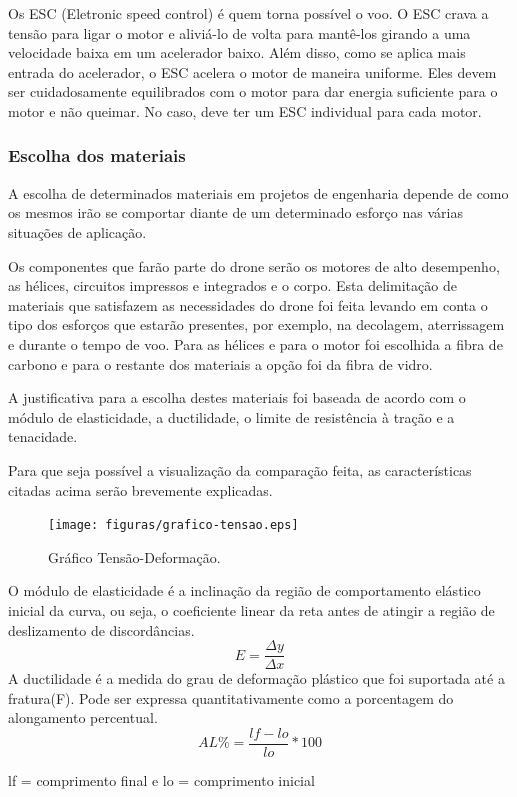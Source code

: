 Os ESC (Eletronic speed control) é quem torna possível o voo. O ESC crava a tensão para ligar o motor e aliviá-lo de volta para mantê-los girando a uma velocidade baixa em um acelerador baixo. Além disso, como se aplica mais entrada do acelerador, o ESC acelera o motor de maneira uniforme.  Eles devem ser cuidadosamente equilibrados com o motor para dar energia suficiente para o motor e não queimar. No caso, deve ter um ESC individual para cada motor. 

\subsubsection{Escolha dos materiais}

A escolha de determinados materiais em projetos de engenharia depende de como os mesmos irão se comportar diante de um determinado esforço nas várias situações de aplicação.

Os componentes que farão parte do drone serão os motores de alto desempenho, as hélices, circuitos impressos e integrados e o corpo.
Esta delimitação de materiais que satisfazem as necessidades do drone foi feita levando em conta o tipo dos esforços que estarão presentes, por exemplo, na decolagem, aterrissagem e durante o tempo de voo. Para as hélices e para o motor foi escolhida a fibra de carbono e para o restante dos materiais a opção foi da fibra de vidro.

A justificativa para a escolha destes materiais foi baseada de acordo com o módulo de elasticidade, a ductilidade, o limite de resistência à tração e a tenacidade. 

Para que seja possível a visualização da comparação feita, as características citadas acima serão brevemente explicadas.


\begin{figure}[h!]
    \centering
      \texttt{[image: figuras/grafico-tensao.eps]}
    \caption{Gráfico Tensão-Deformação.}
    \label{fig:grafico-tensao}
\end{figure}

O módulo de elasticidade é a inclinação da região de comportamento elástico inicial da curva, ou seja, o coeficiente linear da reta antes de atingir a região de deslizamento de discordâncias.
\begin{equation}
E =\frac{\Delta y}{\Delta x}
\end{equation}
A ductilidade é a medida do grau de deformação plástico que foi suportada até a fratura(F). Pode ser expressa quantitativamente como a porcentagem do alongamento percentual.
\begin{equation}
AL\% =\frac{lf - lo}{lo} * 100
\end{equation}
\begin{center}
lf = comprimento final e lo = comprimento inicial
\end{center}

